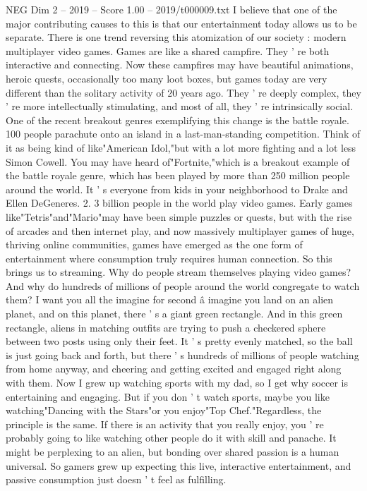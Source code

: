 \begin{textsample}{NEG Dim 2 – 2019 – Score 1.00 – 2019/t000009.txt}
I believe that one of the major contributing causes to this is that our entertainment today allows us to be separate.
There is one trend reversing this atomization of our society : modern multiplayer video games.
Games are like a shared campfire.
They ' re both interactive and connecting.
Now these campfires may have beautiful animations, heroic quests, occasionally too many loot boxes, but games today are very different than the solitary activity of 20 years ago.
They ' re deeply complex, they ' re more intellectually stimulating, and most of all, they ' re intrinsically social.
One of the recent breakout genres exemplifying this change is the battle royale. 100 people parachute onto an island in a last-man-standing competition.
Think of it as being kind of like"American Idol,"but with a lot more fighting and a lot less Simon Cowell.
You may have heard of"Fortnite,"which is a breakout example of the battle royale genre, which has been played by more than 250 million people around the world.
It ' s everyone from kids in your neighborhood to Drake and Ellen DeGeneres. 2. 3 billion people in the world play video games.
Early games like"Tetris"and"Mario"may have been simple puzzles or quests, but with the rise of arcades and then internet play, and now massively multiplayer games of huge, thriving online communities, games have emerged as the one form of entertainment where consumption truly requires human connection.
So this brings us to streaming.
Why do people stream themselves playing video games?
And why do hundreds of millions of people around the world congregate to watch them?
I want you all the imagine for second â imagine you land on an alien planet, and on this planet, there ' s a giant green rectangle.
And in this green rectangle, aliens in matching outfits are trying to push a checkered sphere between two posts using only their feet.
It ' s pretty evenly matched, so the ball is just going back and forth, but there ' s hundreds of millions of people watching from home anyway, and cheering and getting excited and engaged right along with them.
Now I grew up watching sports with my dad, so I get why soccer is entertaining and engaging.
But if you don ' t watch sports, maybe you like watching"Dancing with the Stars"or you enjoy"Top Chef."Regardless, the principle is the same.
If there is an activity that you really enjoy, you ' re probably going to like watching other people do it with skill and panache.
It might be perplexing to an alien, but bonding over shared passion is a human universal.
So gamers grew up expecting this live, interactive entertainment, and passive consumption just doesn ' t feel as fulfilling.

\end{textsample}
